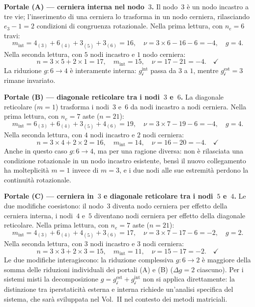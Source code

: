 \medskip
\noindent\textbf{Portale (A) --- cerniera interna
	nel nodo~$3$.}
Il nodo~$3$ è un nodo incastro a tre vie;
l'inserimento di una cerniera lo trasforma in
un nodo cerniera, rilasciando $e_3 - 1 = 2$
condizioni di congruenza rotazionale.
Nella prima lettura, con $n_e = 6$ travi:
\[
m_{\text{int}} = 4_{(3)} + 6_{(4)} +
3_{(5)} + 3_{(6)} = 16,
\quad
\nu = 3\times6 - 16 - 6 = -4,
\quad g = 4.
\]
Nella seconda lettura, con $5$ nodi incastro
e $1$ nodo cerniera:
\[
n = 3\times5 + 2\times1 = 17,
\quad
m_{\text{int}} = 15,
\quad
\nu = 17 - 21 = -4. \quad\checkmark
\]
La riduzione $g: 6 \to 4$ è interamente interna:
$g_{\mathscr{i}}^{\text{int}}$ passa da $3$ a $1$,
mentre $g_{\mathscr{i}}^{\text{est}} = 3$ rimane
invariato.

\medskip
\noindent\textbf{Portale (B) --- diagonale
	reticolare tra i nodi~$3$ e~$6$.}
La diagonale reticolare ($m = 1$) trasforma i
nodi~$3$ e~$6$ da nodi incastro a nodi cerniera.
Nella prima lettura, con $n_e = 7$ aste
($n = 21$):
\[
m_{\text{int}} = 6_{(3)} + 6_{(4)} +
3_{(5)} + 4_{(6)} = 19,
\quad
\nu = 3\times7 - 19 - 6 = -4,
\quad g = 4.
\]
Nella seconda lettura, con $4$ nodi incastro
e $2$ nodi cerniera:
\[
n = 3\times4 + 2\times2 = 16,
\quad
m_{\text{int}} = 14,
\quad
\nu = 16 - 20 = -4. \quad\checkmark
\]
Anche in questo caso $g: 6 \to 4$, ma per una
ragione diversa: non è rilasciata una condizione
rotazionale in un nodo incastro esistente, bensì
il nuovo collegamento ha molteplicità $m = 1$
invece di $m = 3$, e i due nodi alle sue estremità
perdono la continuità rotazionale.

\medskip
\noindent\textbf{Portale (C) --- cerniera in~$3$
	e diagonale reticolare tra i nodi~$5$ e~$4$.}
Le due modifiche coesistono: il nodo~$3$ diventa
nodo cerniera per effetto della cerniera interna,
i nodi~$4$ e~$5$ diventano nodi cerniera per
effetto della diagonale reticolare.
Nella prima lettura, con $n_e = 7$ aste
($n = 21$):
\[
m_{\text{int}} = 4_{(3)} + 6_{(4)} +
4_{(5)} + 3_{(6)} = 17,
\quad
\nu = 3\times7 - 17 - 6 = -2,
\quad g = 2.
\]
Nella seconda lettura, con $3$ nodi incastro
e $3$ nodi cerniera:
\[
n = 3\times3 + 2\times3 = 15,
\quad
m_{\text{int}} = 11,
\quad
\nu = 15 - 17 = -2. \quad\checkmark
\]
Le due modifiche interagiscono: la riduzione
complessiva $g: 6 \to 2$ è maggiore della somma
delle riduzioni individuali dei portali (A) e (B)
($\Delta g = 2$ ciascuno). Per i sistemi misti
la decomposizione $g = g_{\mathscr{i}}^{\text{est}}
+ g_{\mathscr{i}}^{\text{int}}$ non si applica
direttamente: la distinzione tra iperstaticità esterna e
interna richiede un'analisi specifica del sistema,
che sarà sviluppata nel Vol.~II nel contesto
dei metodi matriciali.



